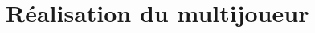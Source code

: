 \documentclass[../doc.tex]{subfiles}
\begin{document}
    \section{Réalisation du multijoueur}
\end{document}
